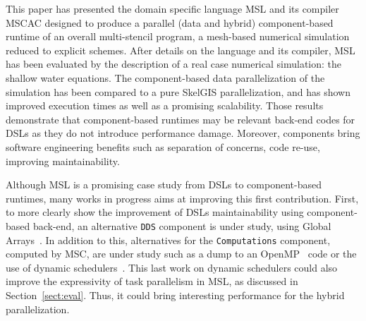 This paper has presented the domain specific language MSL and its compiler MSCAC designed to produce a parallel (data and hybrid) component-based runtime of an overall multi-stencil program, \ie a mesh-based numerical simulation reduced to explicit schemes. After details on the language and its compiler, MSL has been evaluated by the description of a real case numerical simulation: the shallow water equations. The component-based data parallelization of the simulation has been compared to a pure SkelGIS parallelization, and has shown improved execution times as well as a promising scalability. Those results demonstrate that component-based runtimes may be relevant back-end codes for DSLs as they do not introduce performance damage. Moreover, components bring software engineering benefits such as separation of concerns, code re-use, improving maintainability.

Although MSL is a promising case study from DSLs to component-based runtimes, many works in progress aims at improving this first contribution. First, to more clearly show the improvement of DSLs maintainability using component-based back-end, an alternative \texttt{DDS} component is under study, using Global Arrays~\cite{Nieplocha:2006:AAP:1125980.1125985}. In addition to this, alternatives for the \texttt{Computations} component, computed by MSC, are under study such as a dump to an OpenMP~\cite{660313} code or the use of dynamic schedulers~\cite{Augonnet2011,Gautier:2013:XRS:2510661.2511383}. This last work on dynamic schedulers could also improve the expressivity of task parallelism in MSL, as discussed in Section~\ref{sect:eval}. Thus, it could bring interesting performance for the hybrid parallelization.
